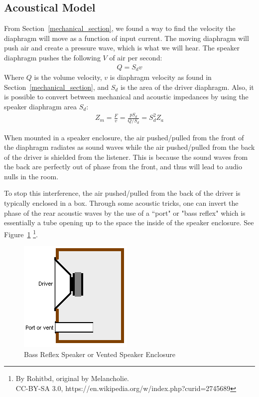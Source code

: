 \documentclass[10pt,letterpaper]{book}
\begin{document}
\subsection{Acoustical Model}\label{sec:acoustic_model}
From Section~\ref{mechanical_section}, we found a way to find the velocity the diaphragm will move as a function of input current. The moving diaphragm will push air and create a pressure wave, which is what we will hear. The speaker diaphragm pushes the following $V$ of air per second:
\begin{align}
Q=S_dv\label{eq:volume_velocity}
\end{align}
Where $Q$ is the volume velocity, $v$ is diaphragm velocity as found in Section~\ref{mechanical_section}, and $S_d$ is the area of the driver diaphragm. Also, it is possible to convert between mechanical and acoustic impedances by using the speaker diaphragm area $S_d$:
\begin{align}
Z_m=\frac{F}{v}=\frac{pS_d}{Q/S_d}= S_d^2 Z_a\label{eq:acoustic-to-mech_imp}
\end{align}

When mounted in a speaker enclosure, the air pushed/pulled from the front of the diaphragm radiates as sound waves while the air pushed/pulled from the back of the driver is shielded from the listener. This is because the sound waves from the back are perfectly out of phase from the front, and thus will lead to audio nulls in the room.

To stop this interference, the air pushed/pulled from the back of the driver is typically enclosed in a box. Through some acoustic tricks, one can invert the phase of the rear acoustic waves by the use of a ``port" or "bass reflex" which is essentially a tube opening up to the space the inside of the speaker enclosure. See Figure~\ref{bass_reflex} \footnote{By Rohitbd, original by Melancholie.\\
CC-BY-SA 3.0, https://en.wikipedia.org/w/index.php?curid=2745689}.

\begin{figure}
\centering
\includegraphics[height=0.25\textheight]{Bass_reflex_spk.png}
\caption{Bass Reflex Speaker or Vented Speaker Enclosure}\label{bass_reflex}
\end{figure}
\end{document}
